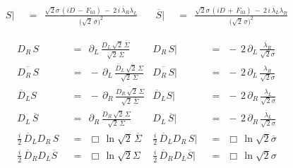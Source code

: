 \documentclass[14pt]{article}
\newcommand{\p}{\partial}
\newcommand{\ov}{\overline}
\begin{document}
\begin{align*}
	S \Big| &    ~~=~~    \frac{ \sqrt{2}\ov\sigma\, ( iD \,-\, F_{03} ) ~-~ 2\,i\, \ov\lambda{}_R \lambda_L }
						{ \big( \sqrt{2}\, \ov\sigma \big)^2 }
	\quad
	&
	\ov S \Big| &    ~~=~~    \frac{ \sqrt{2}\sigma\, ( iD \,+\, F_{03} ) ~-~ 2\,i\, \ov\lambda{}_L \lambda_R }
						{ \big( \sqrt{2}\, \sigma \big)^2 }
\end{align*}

\begin{align*}
%
	D_R\, S &    ~~=~~    \p_L\, \frac{ D_L\, \sqrt{2}\,\ov\Sigma}{\sqrt{2}\,\ov\Sigma}
	&
	D_R\, S \Big| &    ~~=~~    -\, 2\, \p_L\, \frac{\ov\lambda{}_R}{\sqrt{2}\ov\sigma}
	\\[2mm]
%
	\ov {D_R\, S} &    ~~=~~    -\, \p_L\, \frac{\ov D{}_L\, \sqrt{2}\,\Sigma}{\sqrt{2}\, \Sigma}
	&
	\ov {D_R\, S} \Big| &    ~~=~~    -\, 2\, \p_L\, \frac{\lambda_R}{\sqrt{2}\sigma}
	\\[2mm]
%
	\ov D{}_L S &    ~~=~~    -\, \p_R\, \frac{ \ov{D_R\, \sqrt{2}\, \Sigma} }{ \sqrt{2}\, \ov\Sigma }
	&
	\ov D{}_L S \Big| &    ~~=~~    -\, 2\, \p_R\, \frac{\lambda_L}{\sqrt{2}\ov\sigma}
	\\[2mm]
%
	D_L\, \ov S &    ~~=~~    \p_R\, \frac{D_R\, \sqrt{2}\, \Sigma}{\sqrt{2}\,\Sigma}
	&
	D_L\, \ov S \Big| &    ~~=~~    -\, 2\, \p_R\, \frac{\ov\lambda{}_L}{\sqrt{2}\sigma}
	\\[6mm]
%
	\frac{i}{2}\, \ov D{}_L D_R\, S &    ~~=~~    \Box\, \ln \sqrt{2}\, \ov\Sigma
	&
	\frac{i}{2}\, \ov D{}_L D_R\, S \Big| &    ~~=~~    \Box\, \ln \sqrt{2}\ov\sigma
	\\[2mm]
%
	\frac{i}{2}\, \ov D{}_R D_L \ov S &    ~~=~~    \Box\, \ln \sqrt{2}\Sigma
	&
	\frac{i}{2}\, \ov D{}_R D_L \ov S \Big| &    ~~=~~    \Box\, \ln \sqrt{2}\sigma
\end{align*}


\pagebreak
\end{document}
